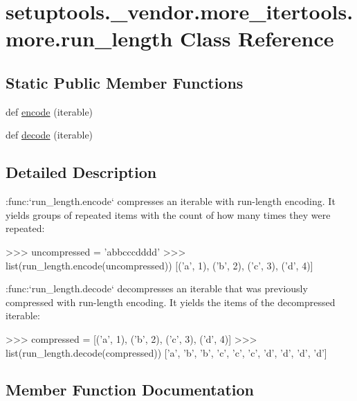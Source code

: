 \hypertarget{classsetuptools_1_1__vendor_1_1more__itertools_1_1more_1_1run__length}{}\section{setuptools.\+\_\+vendor.\+more\+\_\+itertools.\+more.\+run\+\_\+length Class Reference}
\label{classsetuptools_1_1__vendor_1_1more__itertools_1_1more_1_1run__length}
\subsection*{Static Public Member Functions}
\begin{DoxyCompactItemize}
\item 
def \hyperlink{classsetuptools_1_1__vendor_1_1more__itertools_1_1more_1_1run__length_a4046f1d68dbcb52ce9caa17fb2d356cd}{encode} (iterable)
\item 
def \hyperlink{classsetuptools_1_1__vendor_1_1more__itertools_1_1more_1_1run__length_a74cde72972c533e9994d0d5829dbb836}{decode} (iterable)
\end{DoxyCompactItemize}


\subsection{Detailed Description}
\begin{DoxyVerb}:func:`run_length.encode` compresses an iterable with run-length encoding.
It yields groups of repeated items with the count of how many times they
were repeated:

    >>> uncompressed = 'abbcccdddd'
    >>> list(run_length.encode(uncompressed))
    [('a', 1), ('b', 2), ('c', 3), ('d', 4)]

:func:`run_length.decode` decompresses an iterable that was previously
compressed with run-length encoding. It yields the items of the
decompressed iterable:

    >>> compressed = [('a', 1), ('b', 2), ('c', 3), ('d', 4)]
    >>> list(run_length.decode(compressed))
    ['a', 'b', 'b', 'c', 'c', 'c', 'd', 'd', 'd', 'd']\end{DoxyVerb}
 

\subsection{Member Function Documentation}
\mbox{\label{classsetuptools_1_1__vendor_1_1more__itertools_1_1more_1_1run__length_a74cde72972c533e9994d0d5829dbb836}} 
